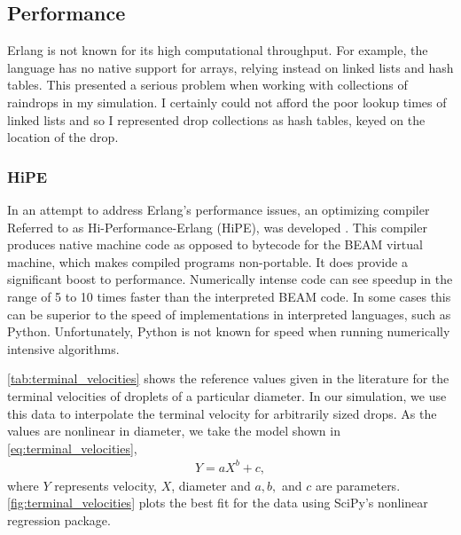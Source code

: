 \documentclass[twocolumn,a4paper,10pt]{article}
\begin{document}
\subsection{Performance}

Erlang is not known for its high computational throughput. For
example, the language has no native support for arrays, relying instead on
linked lists and hash tables. This presented a serious problem when working with
collections of raindrops in my simulation. I certainly could not afford the poor
lookup times of linked lists and so I represented drop collections as hash
tables, keyed on the location of the drop.

\subsubsection{HiPE}

In an attempt to address Erlang's performance issues, an optimizing compiler
Referred to as Hi-Performance-Erlang (HiPE), was developed \cite{hipe}. This
compiler produces native machine code as opposed to bytecode for the BEAM
virtual machine, which makes compiled programs non-portable. It does provide a
significant boost to performance. Numerically intense code can see speedup in
the range of 5 to 10 times faster than the interpreted BEAM code. In some cases
this can be superior to the speed of implementations in interpreted languages,
such as Python. Unfortunately, Python is not known for speed when running
numerically intensive algorithms.


\autoref{tab:terminal_velocities} shows the reference values given in the
literature for the terminal velocities of droplets of a particular diameter. In
our simulation, we use this data to interpolate the terminal velocity for
arbitrarily sized drops. As the values are nonlinear in diameter, we take the
model shown in \autoref{eq:terminal_velocities},
\begin{align}
    Y = aX^b + c,
    \label{eq:terminal_velocities}
\end{align}
where $Y$ represents velocity, $X$, diameter and $a, b,$ and $c$ are parameters.
\autoref{fig:terminal_velocities} plots the best fit for the data using SciPy's
nonlinear regression package\cite{scipy}.
\end{document}
